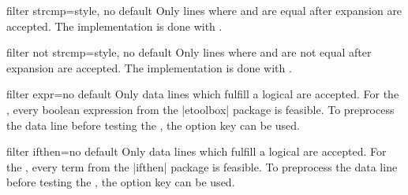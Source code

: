 \documentclass[a4paper,11pt]{ltxdoc}
\begin{document}
\begin{docCsvKey}{filter strcmp}{=}{style, no default}
  Only lines where  and  are equal after expansion
  are accepted.
  The implementation is done with .
\end{docCsvKey}


\begin{docCsvKey}{filter not strcmp}{=}{style, no default}
  Only lines where  and  are not equal after expansion
  are accepted.
  The implementation is done with .
\end{docCsvKey}


\begin{docCsvKey}[][doc new=2016-07-01]{filter expr}{=}{no default}
  Only data lines which fulfill a logical  are accepted.
  For the , every boolean expression
  from the |etoolbox| package is feasible.
  To preprocess the data line before testing the ,
  the option key  can be used.
\begin{dispExample}
\end{dispExample}
\end{docCsvKey}

\clearpage
\begin{docCsvKey}[][doc new=2016-07-01]{filter ifthen}{=}{no default}
  Only data lines which fulfill a logical  are accepted.
  For the , every term from the |ifthen| package
  is feasible.
  To preprocess the data line before testing the ,
  the option key  can be used.

\begin{dispExample}
\end{dispExample}

\end{docCsvKey}
\end{document}
